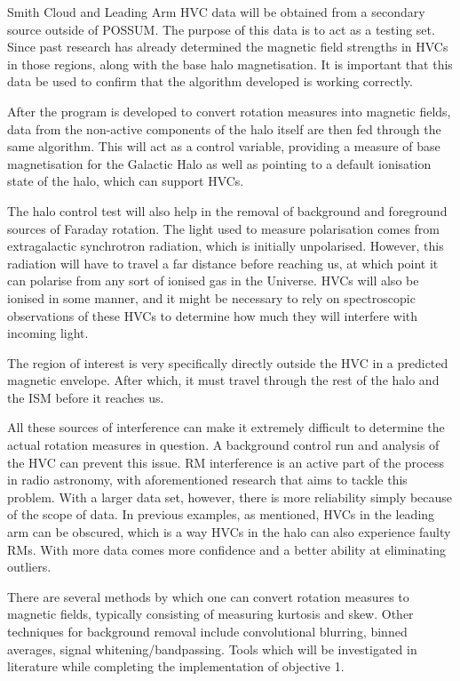 Smith Cloud and Leading Arm HVC data will be obtained from a secondary source outside of POSSUM. The purpose of this data is to act as a testing set. Since past research has already determined the magnetic field strengths in HVCs in those regions, along with the base halo magnetisation. It is important that this data be used to confirm that the algorithm developed is working correctly.

After the program is developed to convert rotation measures into magnetic fields, data from the non-active components of the halo itself are then fed through the same algorithm. This will act as a control variable, providing a measure of base magnetisation for the Galactic Halo as well as pointing to a default ionisation state of the halo, which can support HVCs.

The halo control test will also help in the removal of background and foreground sources of Faraday rotation. The light used to measure polarisation comes from extragalactic synchrotron radiation, which is initially unpolarised. However, this radiation will have to travel a far distance before reaching us, at which point it can polarise from any sort of ionised gas in the Universe. HVCs will also be ionised in some manner, and it might be necessary to rely on spectroscopic observations of these HVCs to determine how much they will interfere with incoming light.

The region of interest is very specifically directly outside the HVC in a predicted magnetic envelope. After which, it must travel through the rest of the halo and the ISM before it reaches us.

All these sources of interference can make it extremely difficult to determine the actual rotation measures in question. A background control run and analysis of the HVC can prevent this issue. RM interference is an active part of the process in radio astronomy, with aforementioned research that aims to tackle this problem. With a larger data set, however, there is more reliability simply because of the scope of data. In previous examples, as mentioned, HVCs in the leading arm can be obscured, which is a way HVCs in the halo can also experience faulty RMs. With more data comes more confidence and a better ability at eliminating outliers.

There are several methods by which one can convert rotation measures to magnetic fields, typically consisting of measuring kurtosis and skew. Other techniques for background removal include convolutional blurring, binned averages, signal whitening/bandpassing. Tools which will be investigated in literature while completing the implementation of objective 1.

